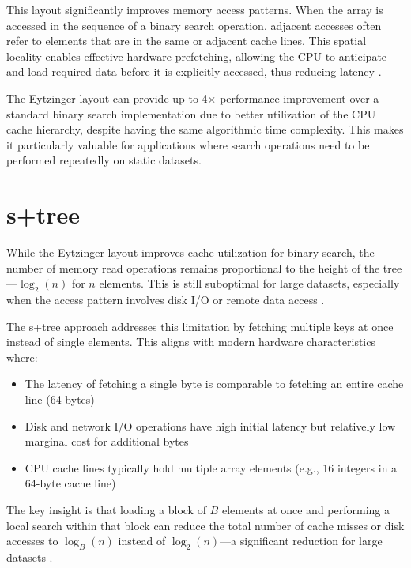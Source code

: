 This layout significantly improves memory access patterns. When the array is accessed in the sequence of a binary search operation, adjacent accesses often refer to elements that are in the same or adjacent cache lines. This spatial locality enables effective hardware prefetching, allowing the CPU to anticipate and load required data before it is explicitly accessed, thus reducing latency \citep{binary_search}.

The Eytzinger layout can provide up to 4× performance improvement over a standard binary search implementation due to better utilization of the CPU cache hierarchy, despite having the same algorithmic time complexity. This makes it particularly valuable for applications where search operations need to be performed repeatedly on static datasets.

\section{\texorpdfstring{\ac{s+tree}}{S+tree}}
\label{tb:static_btree}

While the Eytzinger layout improves cache utilization for binary search, the number of memory read operations remains proportional to the height of the tree—$\log_2(n)$ for $n$ elements. This is still suboptimal for large datasets, especially when the access pattern involves disk I/O or remote data access \citep{static_b_trees}.

The \ac{s+tree} approach addresses this limitation by fetching multiple keys at once instead of single elements. This aligns with modern hardware characteristics where:

\begin{itemize}
    \item The latency of fetching a single byte is comparable to fetching an entire cache line (64 bytes)
    \item Disk and network I/O operations have high initial latency but relatively low marginal cost for additional bytes
    \item CPU cache lines typically hold multiple array elements (e.g., 16 integers in a 64-byte cache line)
\end{itemize}

The key insight is that loading a block of $B$ elements at once and performing a local search within that block can reduce the total number of cache misses or disk accesses to $\log_B(n)$ instead of $\log_2(n)$—a significant reduction for large datasets \citep{static_b_trees}.

